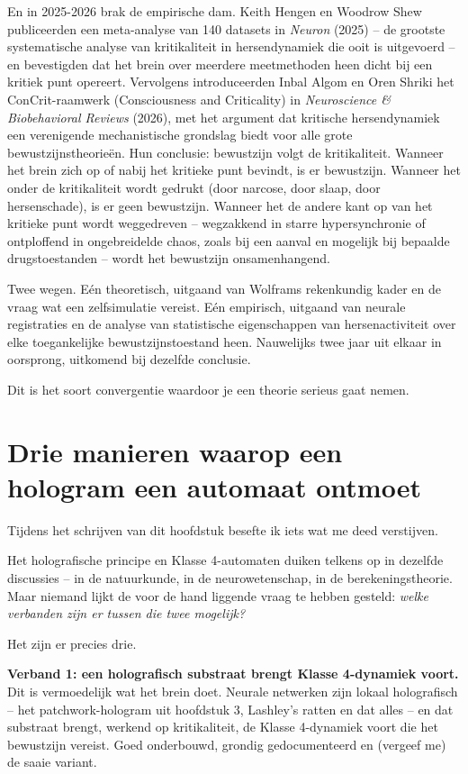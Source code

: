 \documentclass[11pt, twoside, openright]{book}
\begin{document}
En in 2025-2026 brak de empirische dam. Keith Hengen en Woodrow Shew publiceerden een meta-analyse van 140 datasets in \textit{Neuron} (2025) -- de grootste systematische analyse van kritikaliteit in hersendynamiek die ooit is uitgevoerd -- en bevestigden dat het brein over meerdere meetmethoden heen dicht bij een kritiek punt opereert. Vervolgens introduceerden Inbal Algom en Oren Shriki het ConCrit-raamwerk (Consciousness and Criticality) in \textit{Neuroscience \& Biobehavioral Reviews} (2026), met het argument dat kritische hersendynamiek een verenigende mechanistische grondslag biedt voor alle grote bewustzijnstheorieën. Hun conclusie: bewustzijn volgt de kritikaliteit. Wanneer het brein zich op of nabij het kritieke punt bevindt, is er bewustzijn. Wanneer het onder de kritikaliteit wordt gedrukt (door narcose, door slaap, door hersenschade), is er geen bewustzijn. Wanneer het de andere kant op van het kritieke punt wordt weggedreven -- wegzakkend in starre hypersynchronie of ontploffend in ongebreidelde chaos, zoals bij een aanval en mogelijk bij bepaalde drugstoestanden -- wordt het bewustzijn onsamenhangend.

Twee wegen. Eén theoretisch, uitgaand van Wolframs rekenkundig kader en de vraag wat een zelfsimulatie vereist. Eén empirisch, uitgaand van neurale registraties en de analyse van statistische eigenschappen van hersenactiviteit over elke toegankelijke bewustzijnstoestand heen. Nauwelijks twee jaar uit elkaar in oorsprong, uitkomend bij dezelfde conclusie.

Dit is het soort convergentie waardoor je een theorie serieus gaat nemen.

\section*{Drie manieren waarop een hologram een automaat ontmoet}

Tijdens het schrijven van dit hoofdstuk besefte ik iets wat me deed verstijven.

Het holografische principe en Klasse 4-automaten duiken telkens op in dezelfde discussies -- in de natuurkunde, in de neurowetenschap, in de berekeningstheorie. Maar niemand lijkt de voor de hand liggende vraag te hebben gesteld: \textit{welke verbanden zijn er tussen die twee mogelijk?}

Het zijn er precies drie.

\textbf{Verband 1: een holografisch substraat brengt Klasse 4-dynamiek voort.} Dit is vermoedelijk wat het brein doet. Neurale netwerken zijn lokaal holografisch -- het patchwork-hologram uit hoofdstuk 3, Lashley's ratten en dat alles -- en dat substraat brengt, werkend op kritikaliteit, de Klasse 4-dynamiek voort die het bewustzijn vereist. Goed onderbouwd, grondig gedocumenteerd en (vergeef me) de saaie variant.
\end{document}
